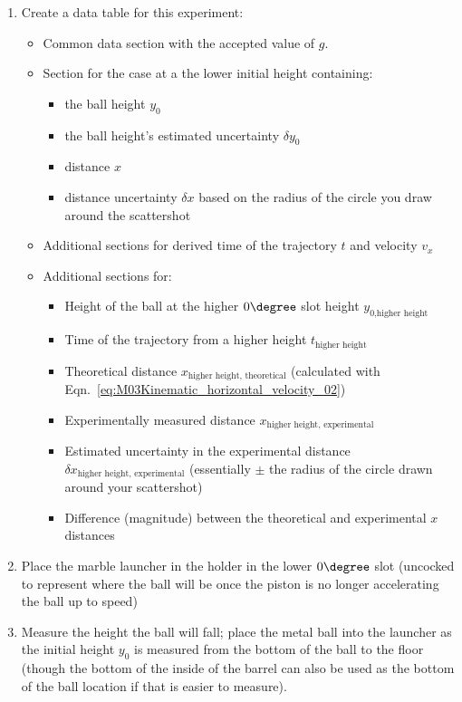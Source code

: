 \begin{enumerate}
\item Create a data table for this experiment:
\begin{itemize}
    \item Common data section with the accepted value of $g$.
    \item Section for the case at a the lower initial height containing:
    \begin{itemize}
        \item the ball height $y_{0}$
        \item the ball height's estimated uncertainty $\delta y_{0}$
        \item distance $x$
        \item distance uncertainty $\delta x$ based on the radius of the circle you draw around the scattershot
    \end{itemize} 
    \item Additional sections for derived time of the trajectory $t$ and velocity $v_{x}$
    \item Additional sections for:
    \begin{itemize}
        \item Height of the ball at the higher $0 \degree$ slot height $y_{0\text{,higher height}}$
        \item Time of the trajectory from a higher height $t_{\text{higher height}}$
        \item Theoretical distance $x_{\text{higher height, theoretical}}$ (calculated with Eqn.~\ref{eq:M03Kinematic_horizontal_velocity_02})
        \item Experimentally measured distance $x_{\text{higher height, experimental}}$
        \item Estimated uncertainty in the experimental distance $\delta x_{\text{higher height, experimental}}$ (essentially $\pm$ the radius of the circle drawn around your scattershot)
        \item Difference (magnitude) between the theoretical and experimental $x$ distances
    \end{itemize}
\end{itemize}
\item Place the marble launcher in the holder in the lower $0\degree$ slot (uncocked to represent where the ball will be once the piston is no longer accelerating the ball up to speed)
\item Measure the height the ball will fall; place the metal ball into the launcher as the initial height $y_{0}$ is measured from the bottom of the ball to the floor (though the bottom of the inside of the barrel can also be used as the bottom of the ball location if that is easier to measure).

\end{enumerate}

